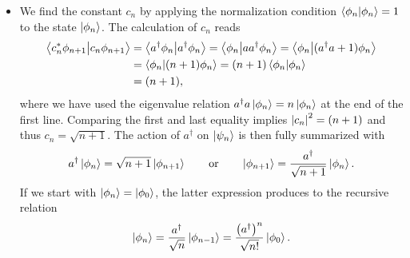 \documentclass[11pt, a4paper]{article}
\newcommand{\eqtext}[1]{\qquad \text{#1} \qquad}
\newcommand{\bbraket}[2]{\big \langle {#1} \big | {#2} \big \rangle}  %
\renewcommand{\k}[1]{\ket{#1}}
\begin{document}
\begin{itemize}
	\item We find the constant $ c_{n} $ by applying the normalization condition $ \braket{\phi_{n}}{\phi_{n}} = 1 $ to the state $ \ket{\phi_{n}} $. The calculation of $ c_{n} $ reads
	\begin{align*}
		\bbraket{c_{n}^{*}\phi_{n+1}}{c_{n}\phi_{n+1}} &= \bbraket{a^{\dagger}\phi_{n}}{a^{\dagger}\phi_{n}} = \bbraket{\phi_{n}}{aa^{\dagger}\phi_{n}} = \bbraket{\phi_{n}}{(a^{\dagger}a + 1)\phi_{n}} \\
		&= \braket{\phi_{n}}{(n + 1)\phi_{n}} = (n+1)\braket{\phi_{n}}{\phi_{n}}\\
        & = (n+1),
	\end{align*}
    where we have used the eigenvalue relation $ a^{\dagger}a \ket{\phi_{n}} = n \ket{\phi_{n}} $ at the end of the first line. Comparing the first and last equality implies  $ \abs{c_{n}}^{2} = (n+1) $ and thus $ c_{n} = \sqrt{n+1} $. The action of $ a^{\dagger} $ on $ \ket{\psi_{n}} $ is then fully summarized with
	\begin{equation*}
        a^{\dagger} \k{\phi_{n}} = \sqrt{n+1}\ket{\phi_{n+1}} \eqtext{or} \ket{\phi_{n + 1}} = \frac{a^{\dagger}}{\sqrt{n+1}}\k{\phi_{n}}. 
	\end{equation*}
	If we start with $ \ket{\phi_{n}} = \ket{\phi_{0}} $, the latter expression produces to the recursive relation
	\begin{equation*}
		\ket{\phi_{n}} = \frac{a^{\dagger}}{\sqrt{n}}\ket{\phi_{n-1}} = \frac{\big(a^{\dagger}\big)^{n}}{\sqrt{n!}}\ket{\phi_{0}}.
	\end{equation*}
	
\end{itemize}
\end{document}
